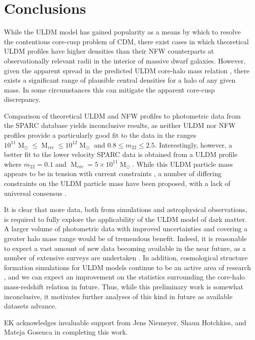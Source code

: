 \documentclass[a4paper,11pt]{article}
\begin{document}
\section{Conclusions}\label{sec:conclusion}

While the ULDM model has gained popularity as a means by which to resolve the contentious core-cusp problem of CDM, there exist cases in which theoretical ULDM profiles have higher densities than their NFW counterparts at observationally relevant radii in the interior of massive dwarf galaxies. However, given the apparent spread in the predicted ULDM core-halo mass relation \cite{Schive:2014hza}, there exists a significant range of plausible central densities for a halo of any given mass. In some circumstances this can mitigate the apparent core-cusp discrepancy. 

Comparison of theoretical ULDM and NFW profiles to photometric data from the SPARC database yields inconclusive results, as neither ULDM nor NFW profiles provide a particularly good fit to the data in the ranges $10^{11}\operatorname{M}_{\odot}\leq \operatorname{M}_{vir} \leq 10^{12}\operatorname{M}_{\odot}$ and $0.8 \leq m_{22} \leq 2.5$. Interestingly, however, a better fit to the lower velocity SPARC data is obtained from a ULDM profile where $m_{22} = 0.1$ and $\operatorname{M}_{vir} = 5\times 10^{11}\operatorname{M}_{\odot}$. While this ULDM particle mass appears to be in tension with current constraints \cite{Amendola:2005ad, Bozek:2014uqa}, a number of differing constraints on the ULDM particle mass have been proposed, with a lack of universal consensus \cite{Armengaud:2017nkf}.

It is clear that more data, both from simulations and astrophysical observations, is required to fully explore the applicability of the ULDM model of dark matter. A larger volume of photometric data with improved uncertainties and covering a greater halo mass range would be of tremendous benefit. Indeed, it is reasonable to expect a vast amount of new data becoming available in the near future, as a number of extensive surveys are undertaken \cite{Simon:2019kmm}. In addition, cosmological structure formation simulations for ULDM models continue to be an active area of research \cite{Lin:2018whl, Clough:2018exo, Mocz:2015sda}, and we can expect an improvement on the statistics surrounding the core-halo mass-redshift relation in future. Thus, while this preliminary work is somewhat inconclusive, it motivates further analyses of this kind in future as available datasets advance. 




\acknowledgments

EK acknowledges invaluable support from Jens Niemeyer, Shaun Hotchkiss, and Mateja Gosenca in completing this work.






 
\end{document}
